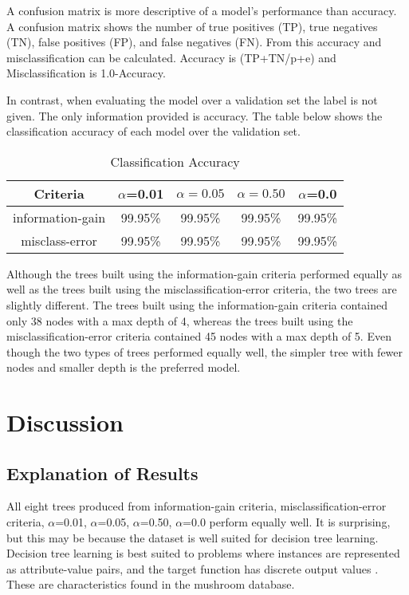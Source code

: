 \documentclass{IEEEtran}
\begin{document}
A confusion matrix is more descriptive of a model's performance than
accuracy. A confusion matrix shows the number of true positives (TP), true
negatives (TN), false positives (FP), and false negatives (FN). From this accuracy
and misclassification can be calculated. Accuracy is (TP+TN/p+e) and
Misclassification is 1.0-Accuracy.

In contrast, when evaluating the model over a validation set the label
is not given. The only information provided is accuracy. The table
below shows the classification accuracy of each model over the
validation set.

\begin{table}[ht]
  \caption{Classification Accuracy}
  \centering
  \begin{tabular}{c c c c c}
  \hline\hline
  Criteria & $\alpha$=0.01 & $\alpha=0.05$ & $\alpha=0.50$ & $\alpha$=0.0 \\ [0.5ex]
  \hline
  information-gain & 99.95\% & 99.95\% & 99.95\% & 99.95\% \\
  misclass-error   & 99.95\% & 99.95\% & 99.95\% & 99.95\% \\ [1ex]
  \hline
  \end{tabular}
  \label{table:nonlin}
\end{table}

Although the trees built using the information-gain criteria performed
equally as well as the trees built using the misclassification-error
criteria, the two trees are slightly different. The trees built using
the information-gain criteria contained only 38 nodes with a max depth
of 4, whereas the trees built using the misclassification-error
criteria contained 45 nodes with a max depth of 5. Even though the two
types of trees performed equally well, the simpler tree with fewer
nodes and smaller depth is the preferred model.

\section{Discussion}
\subsection{Explanation of Results}
All eight trees produced from information-gain criteria,
misclassification-error criteria, $\alpha$=0.01, $\alpha$=0.05, $\alpha$=0.50,
$\alpha$=0.0 perform equally well. It is surprising, but this may be because
the dataset is well suited for decision tree learning. Decision tree
learning is best suited to problems where instances are represented as
attribute-value pairs, and the target function has discrete output
values \parencite{mitchell1997machine}. These are characteristics
found in the mushroom database.
\end{document}
